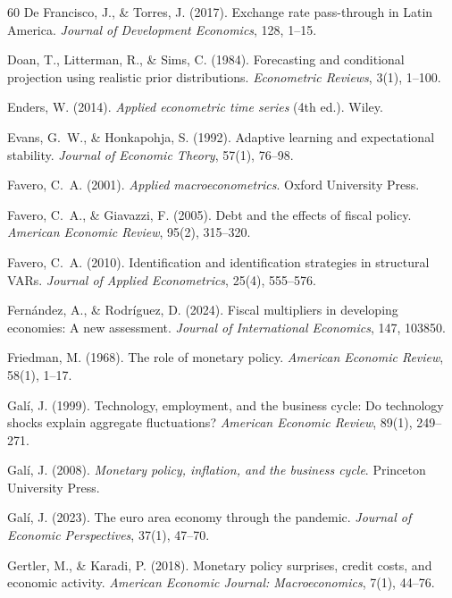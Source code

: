 \documentclass[12pt,a4paper]{article}
\begin{document}
\begin{thebibliography}{60}
 De Francisco, J., \& Torres, J. (2017). Exchange rate pass-through in Latin America. \textit{Journal of Development Economics}, 128, 1--15.

 Doan, T., Litterman, R., \& Sims, C. (1984). Forecasting and conditional projection using realistic prior distributions. \textit{Econometric Reviews}, 3(1), 1--100.

 Enders, W. (2014). \textit{Applied econometric time series} (4th ed.). Wiley.

 Evans, G.~W., \& Honkapohja, S. (1992). Adaptive learning and expectational stability. \textit{Journal of Economic Theory}, 57(1), 76--98.

 Favero, C.~A. (2001). \textit{Applied macroeconometrics}. Oxford University Press.

 Favero, C.~A., \& Giavazzi, F. (2005). Debt and the effects of fiscal policy. \textit{American Economic Review}, 95(2), 315--320.

 Favero, C.~A. (2010). Identification and identification strategies in structural VARs. \textit{Journal of Applied Econometrics}, 25(4), 555--576.

 Fernández, A., \& Rodríguez, D. (2024). Fiscal multipliers in developing economies: A new assessment. \textit{Journal of International Economics}, 147, 103850.

 Friedman, M. (1968). The role of monetary policy. \textit{American Economic Review}, 58(1), 1--17.

 Galí, J. (1999). Technology, employment, and the business cycle: Do technology shocks explain aggregate fluctuations? \textit{American Economic Review}, 89(1), 249--271.

 Galí, J. (2008). \textit{Monetary policy, inflation, and the business cycle}. Princeton University Press.

 Galí, J. (2023). The euro area economy through the pandemic. \textit{Journal of Economic Perspectives}, 37(1), 47--70.

 Gertler, M., \& Karadi, P. (2018). Monetary policy surprises, credit costs, and economic activity. \textit{American Economic Journal: Macroeconomics}, 7(1), 44--76.


\end{thebibliography}
\end{document}
